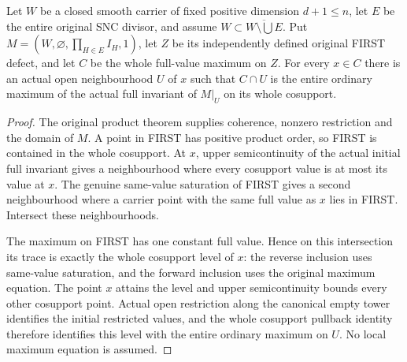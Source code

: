 \begin{theorem}
\label{hir:sharp-actual-first-centre-ordinary-maximum-window}
\leanok
Let $W$ be a closed smooth carrier of fixed positive dimension $d+1\le n$,
let $E$ be the entire original SNC divisor, and assume
$W\subset\overline{W\setminus\bigcup E}$. Put
$M=(W,\varnothing,\prod_{H\in E}I_H,1)$, let $Z$ be its independently
defined original FIRST defect, and let $C$ be the whole full-value maximum
on $Z$. For every $x\in C$ there is an actual open neighbourhood $U$ of
$x$ such that $C\cap U$ is the entire ordinary maximum of the actual
full invariant of $M|_U$ on its whole cosupport.
\end{theorem}
\begin{proof}
The original product theorem supplies coherence, nonzero restriction and
the domain of $M$. A point in FIRST has positive product order, so FIRST
is contained in the whole cosupport. At $x$, upper semicontinuity of the
actual initial full invariant gives a neighbourhood where every cosupport
value is at most its value at $x$. The genuine same-value saturation of
FIRST gives a second neighbourhood where a carrier point with the same
full value as $x$ lies in FIRST. Intersect these neighbourhoods.

The maximum on FIRST has one constant full value. Hence on this
intersection its trace is exactly the whole cosupport level of $x$:
the reverse inclusion uses same-value saturation, and the forward
inclusion uses the original maximum equation. The point $x$ attains the
level and upper semicontinuity bounds every other cosupport point.
Actual open restriction along the canonical empty tower identifies the
initial restricted values, and the whole cosupport pullback identity
therefore identifies this level with the entire ordinary maximum on $U$.
No local maximum equation is assumed.
\end{proof}

